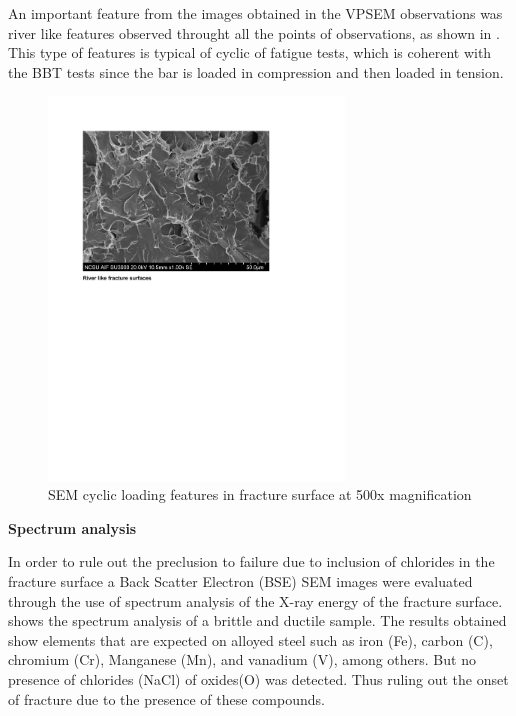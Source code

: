 An important feature from the images obtained in the VPSEM observations was river like features observed throught all the points of observations, as shown in . This type of features is typical of cyclic of fatigue  tests, which is coherent with the BBT tests since the bar is loaded in compression and then loaded in tension. %

\begin{figure}[htbp]
	\centering
	\includegraphics[width=0.7\textwidth]{VAC Thesis 2.0/Chapter-4/figs/BBT_RiverFeatures.pdf}
	\caption{SEM cyclic loading features in fracture surface at 500x magnification}
	\label{fig:RiverFeatures}
\end{figure}

\newpage
\textbf{Spectrum analysis}

In order to rule out the preclusion to failure due to inclusion of chlorides in the fracture surface a Back Scatter Electron (BSE) SEM images were evaluated through the use of spectrum analysis of the X-ray energy of the fracture surface.  shows the spectrum analysis of a brittle and ductile sample. The results obtained show elements that are expected on alloyed steel such as iron (Fe), carbon (C), chromium (Cr), Manganese (Mn), and vanadium (V), among others. But no presence of chlorides (NaCl) of oxides(O) was detected. Thus ruling out the onset of fracture due to the presence of these compounds.

